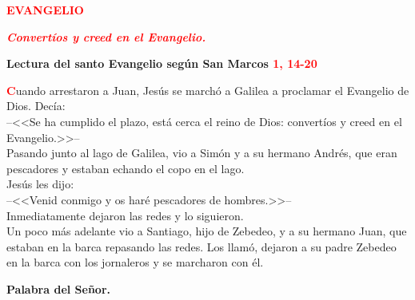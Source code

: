 \documentclass[12pt, letterpaper]{report}
\begin{document}
\begin{center}
\Large {\bfseries \textcolor{red}{EVANGELIO}}
\end{center}

\begin{center}
\large {\bfseries \textit{ \textcolor{red}{Convert\'ios y creed en el Evangelio.}}}
\end{center}

\Huge \textcolor{red}{} \Large {\bfseries Lectura del santo Evangelio seg\'un San Marcos \hspace{1cm} \textcolor{red}{1, 14-20}}

\lettrine[lines=2]{\bfseries \textcolor{red}{C}}{}\Large uando arrestaron a Juan, Jes\'us se march\'o a Galilea a proclamar el Evangelio de Dios. Dec\'ia:\\
--<<Se ha cumplido el plazo, est\'a cerca el reino de Dios: convert\'ios y creed en el Evangelio.>>--\\
Pasando junto al lago de Galilea, vio a Sim\'on y a su hermano Andr\'es, que eran pescadores y estaban echando el copo en el lago.\\
Jes\'us les dijo:\\
--<<Venid conmigo y os har\'e pescadores de hombres.>>--\\
Inmediatamente dejaron las redes y lo siguieron.\\
Un poco m\'as adelante vio a Santiago, hijo de Zebedeo, y a su hermano Juan, que estaban en la barca repasando las redes. Los llam\'o, dejaron a su padre Zebedeo en la barca con los jornaleros y se marcharon con \'el.

{\bfseries Palabra del Se\~nor.}
\end{document}

